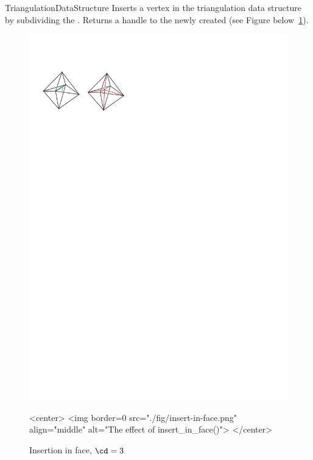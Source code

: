 \begin{ccRefConcept}{TriangulationDataStructure}
{Inserts a vertex in the triangulation data structure by subdividing the
. Returns a handle to the newly created  (see
Figure below~\ref{triangulation:fig:insert-face}).}

\begin{figure}[ht]
\begin{ccTexOnly}
\begin{center}
\includegraphics{Triangulation_ref/fig/insert-in-face.pdf}
\end{center}
\end{ccTexOnly}
\begin{ccHtmlOnly}
<center>
<img border=0 src="./fig/insert-in-face.png" align="middle" alt="The effect of insert_in_face()">
</center>
\end{ccHtmlOnly}
\caption{Insertion in face, $\cd=3$\label{triangulation:fig:insert-face}}
\end{figure}


\end{ccRefConcept}
